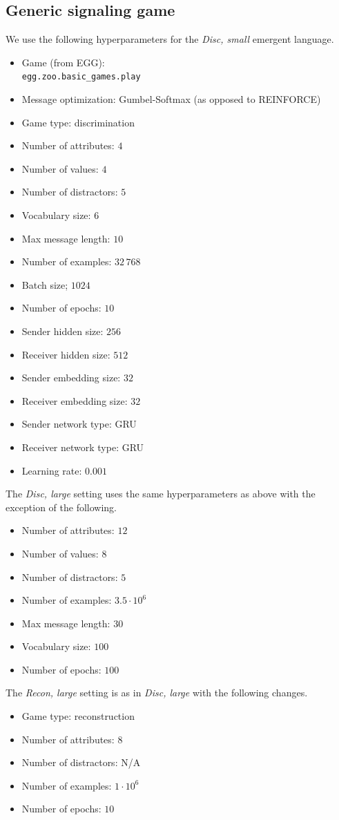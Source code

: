 \subsection{Generic signaling game}
\unskip\label{sec:hparams-egg}
We use the following hyperparameters for the \emph{Disc, small} emergent language.
\begin{itemize}[itemsep=-1.2ex]
  \item Game (from EGG): \\\texttt{egg.zoo.basic\_games.play}
  \item Message optimization: Gumbel-Softmax (as opposed to REINFORCE)
  \item Game type: discrimination
  \item Number of attributes: $4$
  \item Number of values: $4$
  \item Number of distractors: $5$
  \item Vocabulary size: $6$
  \item Max message length: $10$
  \item Number of examples: $32\,768$
  \item Batch size; $1024$
  \item Number of epochs: $10$
  \item Sender hidden size: $256$
  \item Receiver hidden size: $512$
  \item Sender embedding size: $32$
  \item Receiver embedding size: $32$
  \item Sender network type: GRU
  \item Receiver network type: GRU
  \item Learning rate: $0.001$
\end{itemize}
The \emph{Disc, large} setting uses the same hyperparameters as above with the exception of the following.
\begin{itemize}[itemsep=-1.2ex]
  \item Number of attributes: $12$
  \item Number of values: $8$
  \item Number of distractors: $5$
  \item Number of examples: $3.5\cdot10^6$
  \item Max message length: $30$
  \item Vocabulary size: $100$
  \item Number of epochs: $100$
\end{itemize}
The \emph{Recon, large} setting is as in \emph{Disc, large} with the following changes.
\begin{itemize}[itemsep=-1.2ex]
  \item Game type: reconstruction
  \item Number of attributes: $8$
  \item Number of distractors: N/A
  \item Number of examples: $1\cdot10^6$
  \item Number of epochs: $10$
\end{itemize}


